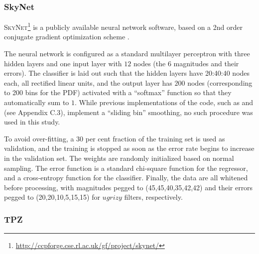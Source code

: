\subsubsection{SkyNet}
\label{sec:skynet}

\textsc{SkyNet}\footnote{\url{http://ccpforge.cse.rl.ac.uk/gf/project/skynet/}} \citep{Graff:14} is a publicly available neural network software, based on a 2nd order conjugate gradient optimization scheme \citep[see][for further details]{Graff:14}. %

The neural network is configured as a standard multilayer perceptron with three hidden layers and one input layer with $12$ nodes (the $6$ magnitudes and their errors).
The classifier is laid out such that the hidden layers have 20:40:40 nodes each, all rectified linear units, and the output layer has $200$ nodes (corresponding to 200 bins for the PDF) activated with a ``softmax'' function so that they automatically sum to $1$.
While previous implementations of the code, such as \citet{Sanchez:14} and \citet{Bonnett:15} (see Appendix C.3), implement a ``sliding bin'' smoothing, no such procedure was used in this study.

To avoid over-fitting, a $30$ per cent fraction of the training set is used as validation, and the training is stopped as soon as the error rate begins to increase in the validation set.
The weights are randomly initialized based on normal sampling.
The error function is a standard chi-square function for the regressor, and a cross-entropy function for the classifier.
Finally, the data are all whitened before processing, with magnitudes pegged to (45,45,40,35,42,42) and their errors pegged to (20,20,10,5,15,15) for $ugrizy$ filters, respectively.

\subsubsection{TPZ}
\label{sec:tpz}

